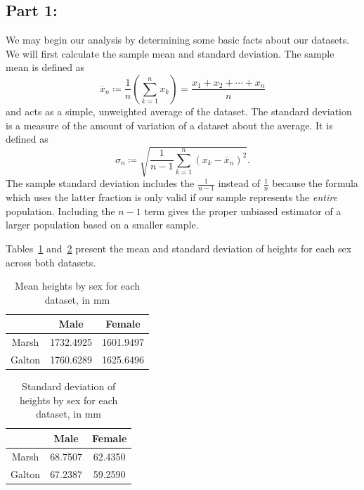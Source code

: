 \subsection{Part 1:}\label{subsec:part-1:}

We may begin our analysis by determining some basic facts about our datasets.
We will first calculate the sample mean and standard deviation.
The sample mean is defined as
\begin{equation}
    \overline{x}_n\coloneqq\frac{1}{n}\left(\sum_{k=1}^{n}x_k\right)=\frac{x_1+x_2+\cdots+x_n}{n}
    \label{eq:sample-mean}
\end{equation}
and acts as a simple, unweighted average of the dataset.
The standard deviation is a measure of the amount of variation of a dataset about the average.
It is defined as
\begin{equation}
    \sigma_n\coloneqq\sqrt{\frac{1}{n-1}\sum_{k=1}^n(x_k-\overline{x}_n)^2}.
    \label{eq:sample-std-dev}
\end{equation}
The sample standard deviation includes the $\frac{1}{n-1}$ instead of $\frac{1}{n}$ because the formula which uses the latter fraction is only valid if our sample represents the \textit{entire} population.
Including the $n-1$ term gives the proper unbiased estimator of a larger population based on a smaller sample.

Tables~\ref{tab:mean-heights} and~\ref{tab:std-heights} present the mean and standard deviation of heights for each sex across both datasets.

\begin{table}[h]
    \centering
    \begin{tabular}{c|cc}
         & Male & Female \\
         \midrule
        Marsh & 1732.4925 & 1601.9497 \\
        Galton & 1760.6289 & 1625.6496 \\
    \end{tabular}
    \caption{Mean heights by sex for each dataset, in mm}
    \label{tab:mean-heights}
\end{table}

\begin{table}[h]
    \centering
    \begin{tabular}{c|cc}
         & Male & Female \\
         \midrule
        Marsh & 68.7507 & 62.4350 \\
        Galton & 67.2387 & 59.2590 \\
    \end{tabular}
    \caption{Standard deviation of heights by sex for each dataset, in mm}
    \label{tab:std-heights}
\end{table}

